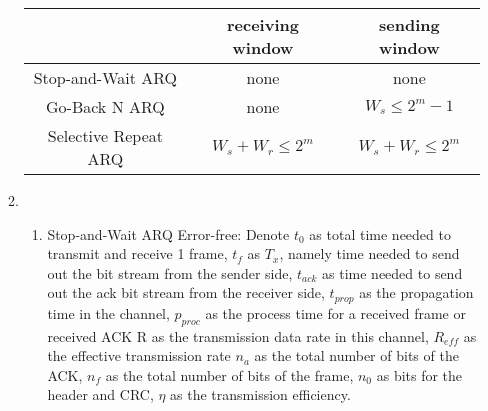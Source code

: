 \documentclass{article}
\begin{document}
\begin{enumerate}
\begin{enumerate}[1)]
\begin{center}
    \end{center}
    \begin{center}
        \begin{tabular}{ccc}
            &receiving window & sending window\\
         \hline
            Stop-and-Wait ARQ 
            & none
            & none
            \\
        \hline
            Go-Back N ARQ 
            &  none
            & $W_s \leq 2^m-1$
            \\
        \hline
            Selective Repeat ARQ  
            &$W_s+W_r \leq 2^m$
            & $W_s+W_r \leq 2^m$
            
        \end{tabular}
    \end{center}
    
    
    \item
    \begin{enumerate}
        \item Stop-and-Wait ARQ
        \newline 
        Error-free:
        \newline
        Denote 
        \newline $t_0$ as total time needed to transmit and receive 1 frame, 
        \newline $t_f$ as $T_x$, namely time needed to send out the bit stream from the sender side, 
        \newline $t_{ack}$ as time needed to send out the ack bit stream from the receiver side, 
        \newline $t_{prop}$ as the propagation time in the channel, 
        \newline$p_{proc}$ as the process time for a received frame or received ACK
        \newline R as the transmission data rate in this channel,
        \newline $R_{eff}$ as the effective transmission rate
        \newline $n_a$ as the total number of bits of the ACK,
        \newline $n_f$ as the total number of bits of the frame,
        \newline $n_0$ as bits for the header and CRC,
        \newline $\eta$ as the transmission efficiency.
        

\end{enumerate}
\end{enumerate}
\end{enumerate}
\end{document}

